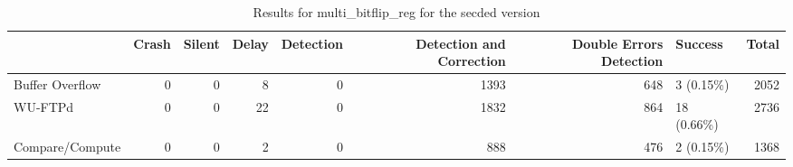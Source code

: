 \begin{table}[t]
	\centering
	\caption{Results for multi_bitflip_reg for the secded version}
	\label{table:end_sim_by_status_secded_1_multi_bitflip_reg}
	\begin{tabular}{lrrrrrrlr}
		\toprule
		                & Crash & Silent & Delay & Detection & Detection and Correction & Double Errors Detection & Success     & Total \\
		\midrule
		Buffer Overflow & 0     & 0      & 8     & 0         & 1393                     & 648                     & 3 (0.15\%)  & 2052  \\
		WU-FTPd         & 0     & 0      & 22    & 0         & 1832                     & 864                     & 18 (0.66\%) & 2736  \\
		Compare/Compute & 0     & 0      & 2     & 0         & 888                      & 476                     & 2 (0.15\%)  & 1368  \\
		\bottomrule
	\end{tabular}
\end{table}
